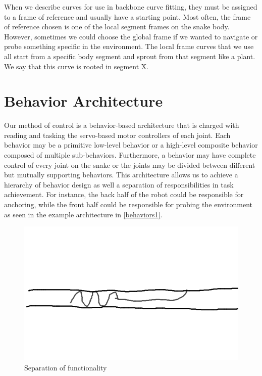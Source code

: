 When we describe curves for use in backbone curve fitting, they must be assigned to a frame of reference and usually have a starting point. Most often, the frame of reference chosen is one of the local segment frames on the snake body. However, sometimes we could choose the global frame if we wanted to navigate or probe something specific in the environment. The local frame curves that we use all start from a specific body segment and sprout from that segment like a plant. We say that this curve is rooted in segment X.

\section{Behavior Architecture}
\label{behaviorarchitecture}

Our method of control is a behavior-based architecture that is charged with reading and tasking the servo-based motor controllers of each joint. Each behavior may be a primitive low-level behavior or a high-level composite behavior composed of multiple sub-behaviors. Furthermore, a behavior may have complete control of every joint on the snake or the joints may be divided between different but mutually supporting behaviors. This architecture allows us to achieve a hierarchy of behavior design as well a separation of responsibilities in task achievement. For instance, the back half of the robot could be responsible for anchoring, while the front half could be responsible for probing the environment as seen in the example architecture in \autoref{behaviors1}.

\begin{figure}[htbp]
\centering
\includegraphics[keepaspectratio,width=400pt,height=0.75\textheight]{2_behaviors_1.png}
\caption{Separation of functionality}
\label{behaviors1}
\end{figure}




